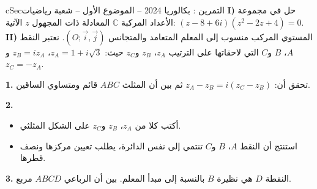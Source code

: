\documentclass[12pt,a4paper]{article}
\newenvironment{BOX}[2]{\begin{otherlanguage}{english}\begin{arbox}{#1}{#2}}{\end{arbox}\end{otherlanguage}}
\newcounter{exo}
\newenvironment{tamrin}[1]{\stepcounter{exo}\begin{BOX}{cSec}{التمرين \theexo: #1}}{\end{BOX}}
\newenvironment{sq}{\begin{itemize}[leftmargin=2.4em,itemsep=3pt]}{\end{itemize}}
\newcommand{\qa}{\item[(أ)]}\newcommand{\qb}{\item[(ب)]}\newcommand{\qc}{\item[(جـ)]}\newcommand{\qd}{\item[(د)]}\newcommand{\qe}{\item[(هـ)]}
\newcommand{\QQ}[1]{\par\smallskip\textbf{#1.} }
\begin{document}
\begin{tamrin}{بكالوريا 2024 -- الموضوع الأول -- شعبة رياضيات}
\textbf{I)} حل في مجموعة الأعداد المركبة $\mathbb{C}$ المعادلة ذات المجهول $z$ الآتية: $\left(z-8+6i\right)\left(z^2-2z+4\right)=0$.
\textbf{II)} المستوي المركب منسوب إلى المعلم المتعامد والمتجانس $\left(O;\vec i,\vec j\right)$.
نعتبر النقط $A$، $B$ و$C$ التي لاحقاتها على الترتيب $z_A$، $z_B$ و$z_C$ حيث: $z_A=1+i\sqrt3$، $z_B=iz_A$ و$z_C=-z_A$.

\QQ{1} تحقق أن: $z_A-z_B=i\left(z_C-z_B\right)$ ثم بين أن المثلث $ABC$ قائم ومتساوي الساقين.

\QQ{2}
\begin{sq}
\qa أكتب كلا من $z_A$، $z_B$ و$z_C$ على الشكل المثلثي.
\qb استنتج أن النقط $A$، $B$ و$C$ تنتمي إلى نفس الدائرة، يطلب تعيين مركزها ونصف قطرها.
\end{sq}
\QQ{3} النقطة $D$ هي نظيرة $B$ بالنسبة إلى مبدأ المعلم. بين أن الرباعي $ABCD$ مربع.
\end{tamrin}
\end{document}
